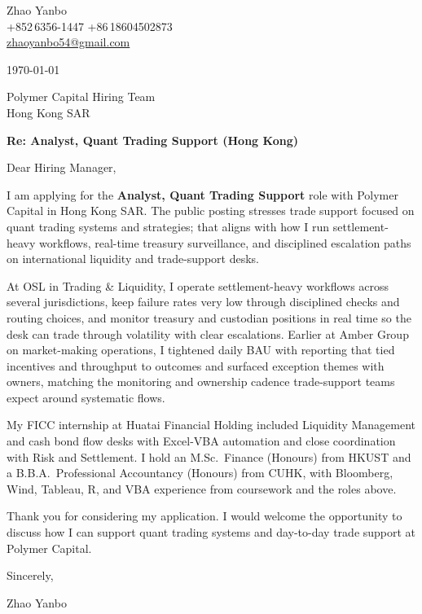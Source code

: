 \documentclass[10pt,a4paper]{article}
\begin{document}
\begin{flushleft}
  Zhao Yanbo\\
  +852\,6356-1447 \;\textbar\; +86\,18604502873\\
  \href{mailto:zhaoyanbo54@gmail.com}{zhaoyanbo54@gmail.com}
\end{flushleft}

\vspace{1em}

\begin{flushright}
  \today
\end{flushright}

\vspace{0.75em}

Polymer Capital Hiring Team\\
Hong Kong SAR
\vspace{1em}

\textbf{Re: Analyst, Quant Trading Support (Hong Kong)}
\vspace{0.75em}

Dear Hiring Manager,

I am applying for the \textbf{Analyst, Quant Trading Support} role with Polymer Capital in Hong Kong SAR. The public posting stresses trade support focused on quant trading systems and strategies; that aligns with how I run settlement-heavy workflows, real-time treasury surveillance, and disciplined escalation paths on international liquidity and trade-support desks.

At OSL in Trading \& Liquidity, I operate settlement-heavy workflows across several jurisdictions, keep failure rates very low through disciplined checks and routing choices, and monitor treasury and custodian positions in real time so the desk can trade through volatility with clear escalations. Earlier at Amber Group on market-making operations, I tightened daily BAU with reporting that tied incentives and throughput to outcomes and surfaced exception themes with owners, matching the monitoring and ownership cadence trade-support teams expect around systematic flows.

My FICC internship at Huatai Financial Holding included Liquidity Management and cash bond flow desks with Excel-VBA automation and close coordination with Risk and Settlement. I hold an M.Sc.\ Finance (Honours) from HKUST and a B.B.A.\ Professional Accountancy (Honours) from CUHK, with Bloomberg, Wind, Tableau, R, and VBA experience from coursework and the roles above.

Thank you for considering my application. I would welcome the opportunity to discuss how I can support quant trading systems and day-to-day trade support at Polymer Capital.

\vspace{1em}

Sincerely,

\vspace{2em}

Zhao Yanbo
\end{document}
